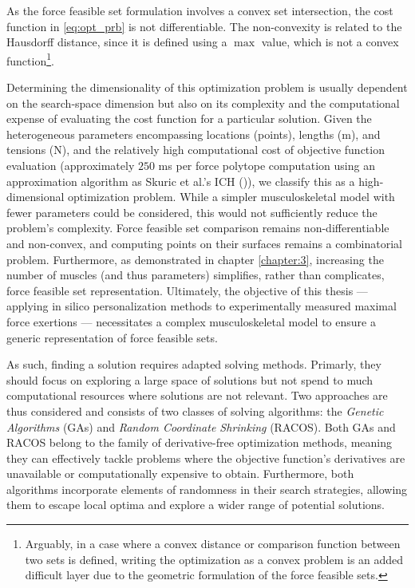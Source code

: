 As the force feasible set formulation involves a convex set intersection, the cost function in \ref{eq:opt_prb} is not differentiable. The non-convexity is related to the Hausdorff distance, since it is defined using a $\max$ value, which is not a convex function\footnote{Arguably, in a case where a convex distance or comparison function between two sets is defined, writing the optimization as a convex problem is an added difficult layer due to the geometric formulation of the force feasible sets.}. 

Determining the dimensionality of this optimization problem is usually dependent on the search-space dimension but also on its complexity and the computational expense of evaluating the cost function for a particular solution. Given the heterogeneous parameters encompassing locations (points), lengths (m), and tensions (N), and the relatively high computational cost of objective function evaluation (approximately $250$ ms per force polytope computation using an approximation algorithm as Skuric et al.'s ICH (\cite{skuricOnLineFeasibleWrench2022})), we classify this as a high-dimensional optimization problem. While a simpler musculoskeletal model with fewer parameters could be considered, this would not sufficiently reduce the problem's complexity. Force feasible set comparison remains non-differentiable and non-convex, and computing points on their surfaces remains a combinatorial problem. Furthermore, as demonstrated in chapter \ref{chapter:3}, increasing the number of muscles (and thus parameters) simplifies, rather than complicates, force feasible set representation. Ultimately, the objective of this thesis — applying in silico personalization methods to experimentally measured maximal force exertions — necessitates a complex musculoskeletal model to ensure a generic representation of force feasible sets.

As such, finding a solution requires adapted solving methods. Primarly, they should focus on exploring a large space of solutions but not spend to much computational resources where solutions are not relevant. Two approaches are thus considered and consists of two classes of solving algorithms: the \emph{Genetic Algorithms} (GAs) and \emph{Random Coordinate Shrinking} (RACOS). Both GAs and RACOS belong to the family of derivative-free optimization methods, meaning they can effectively tackle problems where the objective function's derivatives are unavailable or computationally expensive to obtain. Furthermore, both algorithms incorporate elements of randomness in their search strategies, allowing them to escape local optima and explore a wider range of potential solutions.

